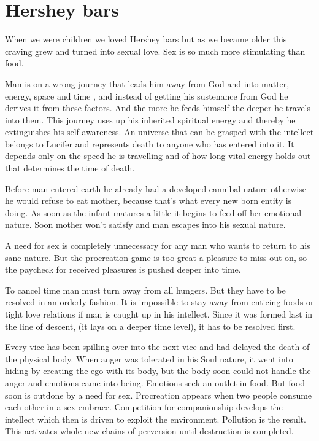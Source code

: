 \documentclass[landscape,twocolumn,letterpaper]{article}
\newcommand{\mest}{matter, energy, space and time }
\begin{document}
\section{Hershey bars}
\label{sec:hb}

When we were children we loved Hershey bars but as we became older
this craving grew and turned into sexual love. Sex is so much more
stimulating than food.

Man is on a wrong journey that leads him away from God and into \mest,
and instead of getting his sustenance from God he derives it from
these factors. And the more he feeds himself the deeper he travels
into them. This journey uses up his inherited spiritual energy and
thereby he extinguishes his self-awareness. An universe that can be
grasped with the intellect belongs to Lucifer and represents death to
anyone who has entered into it. It depends only on the speed he is
travelling and of how long vital energy holds out that determines the
time of death.

Before man entered earth he already had a developed cannibal nature
otherwise he would refuse to eat mother, because that's what every new
born entity is doing. As soon as the infant matures a little it begins
to feed off her emotional nature. Soon mother won't satisfy and man
escapes into his sexual nature.

A need for sex is completely unnecessary for any man who wants to
return to his sane nature. But the procreation game is too great a
pleasure to miss out on, so the paycheck for received pleasures is
pushed deeper into time.

To cancel time man must turn away from all hungers. But they have to
be resolved in an orderly fashion. It is impossible to stay away from
enticing foods or tight love relations if man is caught up in his
intellect. Since it was formed last in the line of descent, (it lays
on a deeper time level), it has to be resolved first.

Every vice has been spilling over into the next vice and had delayed
the death of the physical body. When anger was tolerated in his Soul
nature, it went into hiding by creating the ego with its body, but the
body soon could not handle the anger and emotions came into
being. Emotions seek an outlet in food. But food soon is outdone by a
need for sex. Procreation appears when two people consume each other
in a sex-embrace. Competition for companionship develops the intellect
which then is driven to exploit the environment. Pollution is the
result. This activates whole new chains of perversion until
destruction is completed.
\end{document}
